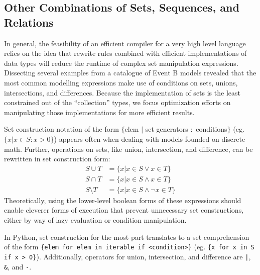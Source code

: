 \documentclass{article}
\begin{document}
\subsection{Other Combinations of Sets, Sequences, and Relations}

In general, the feasibility of an efficient compiler for a very high level language relies on the idea that rewrite rules combined with efficient implementations of data types will reduce the runtime of complex set manipulation expressions. Dissecting several examples from a catalogue of Event B models revealed that the most common modelling expressions make use of conditions on sets, unions, intersections, and differences. Because the implementation of sets is the least constrained out of the ``collection'' types, we focus optimization efforts on manipulating those implementations for more efficient results.

Set construction notation of the form $\{$elem $|$ set generators $:$ conditions$\}$ (eg. $\{x | x \in S : x > 0\}$) appears often when dealing with models founded on discrete math. Further, operations on sets, like union, intersection, and difference, can be rewritten in set construction form:
\begin{align*}
  S \cup T &= \{x | x \in S \lor x \in T\}\\
  S \cap T &= \{x | x \in S \land x \in T\}\\
  S \setminus T &= \{x | x \in S \land \lnot x \in T\}
\end{align*}
Theoretically, using the lower-level boolean forms of these expressions should enable cleverer forms of execution that prevent unnecessary set constructions, either by way of lazy evaluation or condition manipulation.

In Python, set construction for the most part translates to a set comprehension of the form \texttt{\{elem for elem in iterable if <condition>\}} (eg. \texttt{\{x for x in S if x > 0\}}). Additionally, operators for union, intersection, and difference are \texttt{|}, \texttt{\&}, and \texttt{-}.
\end{document}
